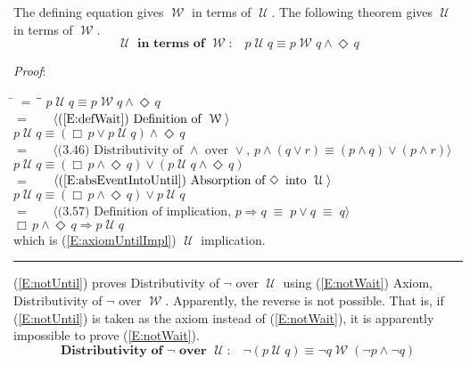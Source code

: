 \documentclass[12pt, fleqn, leqno]{article}
\newcommand{\lgap}{2pt}                             %
\newcommand{\mymathindent}{24pt}                    %
\newcommand{\equivs}{\ensuremath{\;\equiv\;}}       %
\newcommand{\impl}{\ensuremath{\Rightarrow}}        %
\newcommand{\Until}{\;\mathcal{U}\;}
\newcommand{\Wait}{\;\mathcal{W}\;}
\newcommand{\Event}{\Diamond\,}
\newcommand{\Always}{\Box\,}
\newcommand{\myqed}{\rule[-.23ex]{1.2ex}{2.0ex}}
\newcommand{\myqedtab}{\hspace{384pt}}              %
\newcommand{\Gll} {\langle}                         %
\newcommand{\Ggg} {\rangle}                         %
\newcommand{\Hint}[1]     {\ \ \ $\Gll              \mbox{#1} \Ggg$ }   %
\begin{document}
The defining equation gives $\Wait$ in terms of $\Until$. The following theorem gives $\Until$ in terms of $\Wait$.
\begin{equation}\label{E:untilFromWait}
\textbf{$\Until$ in terms of $\Wait$:}\quad p \Until q \equiv p \Wait q\land \Event q
\end{equation}

\emph{Proof}:
\begin{tabbing}
\hspace{\mymathindent} \= $= \;$ \= \myqedtab \= \kill
\> \> $p \Until q \equiv p \Wait q\land \Event q$\\[\lgap]
\> $=$ \> \Hint{(\ref{E:defWait}) Definition of $\Wait$} \\[\lgap]
\> \> $p \Until q \equiv (\Always p\lor p \Until q)\land \Event q$\\[\lgap]
\> $=$ \> \Hint{(3.46) Distributivity of $\land$ over $\lor$, $p\land (q\lor r)\equiv (p\land q)\lor (p\land r)$} \\[\lgap]
\> \> $p \Until q \equiv (\Always p\land \Event q)\lor (p \Until q\land \Event q)$\\[\lgap]
\> $=$ \> \Hint{(\ref{E:absEventIntoUntil}) Absorption of $\Event$ into $\Until$} \\[\lgap]
\> \> $p \Until q \equiv (\Always p\land \Event q)\lor p \Until q$\\[\lgap]
\> $=$ \> \Hint{(3.57) Definition of implication, $p\impl q\equivs p\lor q \equivs q$} \\[\lgap]
\> \> $\Always p\land \Event q\impl p\Until q$\\[\lgap]
\> which is (\ref{E:axiomUntilImpl}) $\Until$ implication. \quad \myqed
\end{tabbing}

(\ref{E:notUntil}) proves Distributivity of $\neg$ over $\Until$ using (\ref{E:notWait}) Axiom, Distributivity of $\neg$ over $\Wait$.
Apparently, the reverse is not possible.
That is, if (\ref{E:notUntil}) is taken as the axiom instead of (\ref{E:notWait}), it is apparently impossible to prove (\ref{E:notWait}).
\begin{equation}\label{E:notUntil}
\textbf{Distributivity of $\neg$ over $\Until$:}\quad \neg (p \Until q) \equiv \neg q \Wait (\neg p \land \neg q)
\end{equation}
\end{document}
